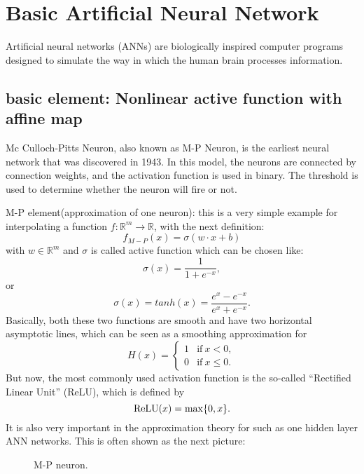 \section{Basic Artificial Neural Network}
Artificial neural networks (ANNs) are biologically inspired computer programs designed to simulate the way in which the human brain processes information.
\subsection{basic element: Nonlinear active function with affine map}
Mc Culloch-Pitts Neuron, also known as M-P Neuron, is the earliest neural network that was discovered in 1943. In this model, the neurons are connected by connection weights, and the activation function is used in binary. The threshold is used to determine whether the neuron will fire or not.

M-P element(approximation of one neuron): this is a very simple example for interpolating a function $f: \mathbb{R}^m \to \mathbb{R}$, with the next definition:
\begin{equation}\label{eq:M-P}
f_{M-P}(x) = \sigma( w \cdot x + b)
\end{equation}
with $w  \in \mathbb{R}^{m} $ and $\sigma$ is called active function which can be chosen like:
\begin{equation}
\sigma (x) = \frac{1}{1 + e^{-x}},
\end{equation}
or
\begin{equation}
\sigma(x) = tanh(x) = \frac{e^x - e^{-x}}{e^x + e^{-x}}.
\end{equation}
Basically, both these two functions are smooth and have two horizontal asymptotic lines, which can be seen as a smoothing approximation for
\begin{equation}
H(x) =
\begin{cases}
1  &\text{if}  ~x < 0, \\
0 &\text{if}~ x \le 0.
\end{cases}
\end{equation}
But now, the most commonly used activation function is the so-called ``Rectified Linear Unit'' (ReLU), which is defined by
\begin{equation}
{\rm ReLU}(x) = \max\{0,x\}.
\end{equation}
It is also very important in the approximation theory for such as one hidden layer ANN networks.
This is often shown as the next picture:
\begin{figure}[!ht]
	\caption{M-P neuron.}
\end{figure}

